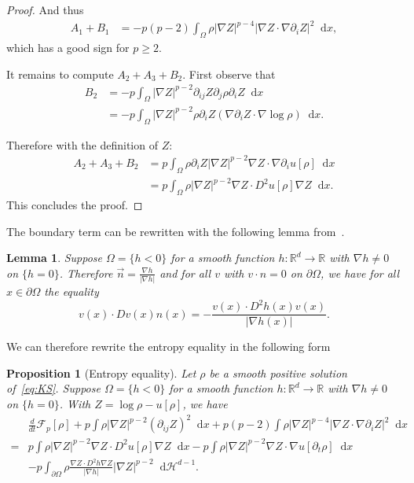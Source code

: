 \documentclass[a4paper,twosided, 11pt]{article}
\renewcommand{\color}[2][]{}
\newcommand{\R}{\mathbb{R}}
\newcommand {\f}   {\frac}
\newcommand {\p}   {\partial}
\theoremstyle{plain}
\newtheorem{lemma}[thm]{Lemma}
\newtheorem{proposition}[thm]{Proposition}
\theoremstyle{remark}
\newcommand{\diff}{\mathop{}\!\mathrm{d}}
\numberwithin{equation}{section}
\begin{document}
\begin{proof}
And thus
\begin{align*}
A_1 + B_1 &= -p(p-2)\int_{\Omega} \rho|\nabla Z|^{p-4}|\nabla Z\cdot\nabla\p_{i}Z|^2\diff x,
\end{align*}
which has a good sign {\color{blue}for $p\ge 2$}.

It remains to compute $A_2 + A_3 + B_2$. First observe that
\begin{align*}
B_2 &= -p \int_{\Omega} |\nabla Z|^{p-2}\p_{ij}Z\p_{j}\rho\p_{i}Z\diff x\\
&= -p \int_{\Omega} |\nabla Z|^{p-2}\rho \p_{i}Z (\nabla \p_{i}Z\cdot\nabla \log\rho)\diff x.
\end{align*}

Therefore with the definition of $Z$:
\begin{align*}
A_2 + A_3 + B_2 &= p\int_{\Omega} \rho\p_{i}Z |\nabla Z|^{p-2}\nabla Z\cdot \nabla \p_i u[\rho]\diff x\\
&=p\int_{\Omega} \rho |\nabla Z|^{p-2}\nabla Z\cdot D^2 u[\rho]\nabla Z\diff x.
\end{align*}
This concludes the proof. 
\end{proof}


The boundary term can be rewritten with the following lemma from~\cite[Lemma 2.5]{toshpulatov}.
\begin{lemma}\label{lem:boundary_h}
Suppose $\Omega=\{h<0\}$ for a smooth function $h: \R^d\to \R$ with $\nabla h\ne 0$ on $\{h=0\}$. Therefore $\vec{n}=\f{\nabla h}{|\nabla h|}$ and for all $v$ with $v \cdot n =0$ on $\p\Omega$, we have for all $x\in \p\Omega$ the equality
$$
v(x)\cdot Dv(x) n(x) = -\f{v(x)\cdot D^{2}h(x)v(x)}{|\nabla h(x)|}.
$$
\end{lemma}

We can therefore rewrite the entropy equality in the following form  
\begin{proposition}[Entropy equality]\label{prop:entropy_equality}
Let $\rho$ be a {\color{blue}smooth positive solution} of~\eqref{eq:KS}. Suppose $\Omega=\{h<0\}$ for a smooth function $h: \R^d\to \R$ with $\nabla h\ne 0$ on $\{h=0\}$. With  $Z=\log\rho - u[\rho]$, we have
\begin{equation}\label{eq:ODE_FP}
\begin{split}
&\f{d}{dt}\mathcal{F}_{p}[\rho] + p\int \rho|\nabla Z|^{p-2}(\p_{ij}Z)^2\diff x + p(p-2)\int \rho|\nabla Z|^{p-4} |\nabla Z\cdot\nabla\p_i Z|^2\diff x\\=&p\int \rho |\nabla Z|^{p-2}\nabla Z\cdot D^2 u[\rho]\nabla Z\diff x - p\int \rho |\nabla Z|^{p-2} \nabla Z\cdot \nabla u[\p_{t}\rho]\diff x\\
&- p\int_{\p\Omega}\rho \f{\nabla Z\cdot D^{2} h \nabla Z}{|\nabla h|} |\nabla Z|^{p-2}\diff \mathcal{H}^{d-1}.
\end{split}
\end{equation} 
\end{proposition}
\end{document}

